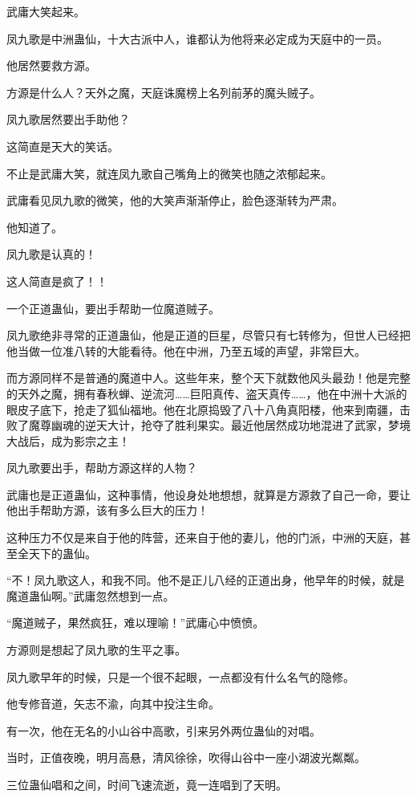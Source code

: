 \begin{this_body}
武庸大笑起来。

凤九歌是中洲蛊仙，十大古派中人，谁都认为他将来必定成为天庭中的一员。

他居然要救方源。

方源是什么人？天外之魔，天庭诛魔榜上名列前茅的魔头贼子。

凤九歌居然要出手助他？

这简直是天大的笑话。

不止是武庸大笑，就连凤九歌自己嘴角上的微笑也随之浓郁起来。

武庸看见凤九歌的微笑，他的大笑声渐渐停止，脸色逐渐转为严肃。

他知道了。

凤九歌是认真的！

这人简直是疯了！！

一个正道蛊仙，要出手帮助一位魔道贼子。

凤九歌绝非寻常的正道蛊仙，他是正道的巨星，尽管只有七转修为，但世人已经把他当做一位准八转的大能看待。他在中洲，乃至五域的声望，非常巨大。

而方源同样不是普通的魔道中人。这些年来，整个天下就数他风头最劲！他是完整的天外之魔，拥有春秋蝉、逆流河……巨阳真传、盗天真传……，他在中洲十大派的眼皮子底下，抢走了狐仙福地。他在北原捣毁了八十八角真阳楼，他来到南疆，击败了魔尊幽魂的逆天大计，抢夺了胜利果实。最近他居然成功地混进了武家，梦境大战后，成为影宗之主！

凤九歌要出手，帮助方源这样的人物？

武庸也是正道蛊仙，这种事情，他设身处地想想，就算是方源救了自己一命，要让他出手帮助方源，该有多么巨大的压力！

这种压力不仅是来自于他的阵营，还来自于他的妻儿，他的门派，中洲的天庭，甚至全天下的蛊仙。

“不！凤九歌这人，和我不同。他不是正儿八经的正道出身，他早年的时候，就是魔道蛊仙啊。”武庸忽然想到一点。

“魔道贼子，果然疯狂，难以理喻！”武庸心中愤愤。

方源则是想起了凤九歌的生平之事。

凤九歌早年的时候，只是一个很不起眼，一点都没有什么名气的隐修。

他专修音道，矢志不渝，向其中投注生命。

有一次，他在无名的小山谷中高歌，引来另外两位蛊仙的对唱。

当时，正值夜晚，明月高悬，清风徐徐，吹得山谷中一座小湖波光粼粼。

三位蛊仙唱和之间，时间飞速流逝，竟一连唱到了天明。


\end{this_body}
